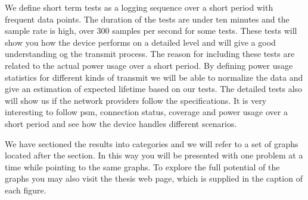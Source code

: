 \documentclass[USenglish]{ifimaster}  %
\begin{document}
We define short term tests as a logging sequence over a short period with frequent data points. The duration of the tests are under ten minutes and the sample rate is high, over 300 samples per second for some tests. These tests will show you how the device performs on a detailed level and will give a good understanding og the transmit process. The reason for including these tests are related to the actual power usage over a short period. By defining power usage statistics for different kinds of transmit we will be able to normalize the data and give an estimation of expected lifetime based on our tests. The detailed tests also will show us if the network providers follow the specifications. It is very interesting to follow \acrshort{psm}, connection status, coverage and power usage over a short period and see how the device handles different scenarios.

We have sectioned the results into categories and we will refer to a set of graphs located after the section. In this way you will be presented with one problem at a time while pointing to the same graphs. To explore the full potential of the graphs you may also visit the thesis web page\cite{url:thesispage}, which is supplied in the caption of each figure.
\end{document}

